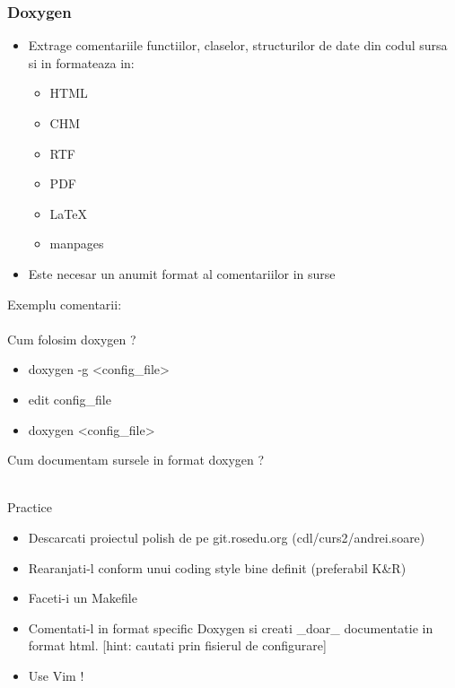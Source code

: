\documentclass{beamer}
\begin{document}
  \begin{frame}[allowframebreaks]
  \frametitle{Doxygen}
  \begin{itemize}
  \item Extrage comentariile functiilor, claselor, structurilor de date din codul sursa si in formateaza in:\\ \begin{itemize} \item HTML \item CHM \item RTF \item PDF \item LaTeX \item manpages \end{itemize}
  \item Este necesar un anumit format al comentariilor in surse
  \end{itemize}
  \framebreak
  Exemplu comentarii:\\ 
  \\ Cum folosim doxygen ? \\
  \begin{itemize}
  \item {\ttfamily doxygen -g <config\_file>}
  \item edit config\_file
  \item {\ttfamily doxygen <config\_file>} 
  \end{itemize}
  \framebreak
  Cum documentam sursele in format doxygen ? \\ 
  \vspace{0.5cm} 
   \\
  \framebreak
  
  \end{frame}

  \begin{frame}{Practice}
  \begin{itemize}
  \setlength{\itemsep}{0.5cm}
  \item Descarcati proiectul polish de pe git.rosedu.org (cdl/curs2/andrei.soare)
  \item Rearanjati-l conform unui coding style bine definit (preferabil K\&R)
  \item Faceti-i un Makefile
  \item Comentati-l in format specific Doxygen si creati \_doar\_ documentatie in format html. [hint: cautati prin fisierul de configurare]
  \item Use Vim !
  \end{itemize}
  \end{frame}
\end{document}
